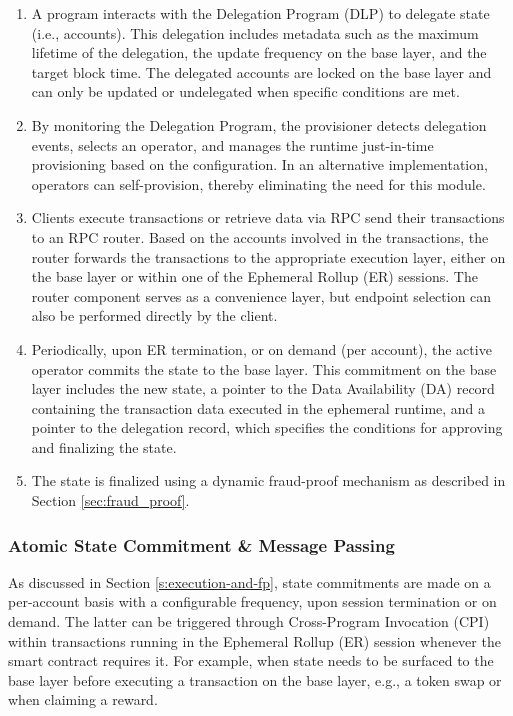 \documentclass{article}
\begin{document}
\begin{enumerate}
    \item A program interacts with the Delegation Program (DLP) to delegate state (i.e., accounts). This delegation includes metadata such as the maximum lifetime of the delegation, the update frequency on the base layer, and the target block time. The delegated accounts are locked on the base layer and can only be updated or undelegated when specific conditions are met.
    
    \item By monitoring the Delegation Program, the provisioner detects delegation events, selects an operator, and manages the runtime just-in-time provisioning based on the configuration. In an alternative implementation, operators can self-provision, thereby eliminating the need for this module.

    \item Clients execute transactions or retrieve data via RPC send their transactions to an RPC router. Based on the accounts involved in the transactions, the router forwards the transactions to the appropriate execution layer, either on the base layer or within one of the Ephemeral Rollup (ER) sessions. The router component serves as a convenience layer, but endpoint selection can also be performed directly by the client.

    \item Periodically, upon ER termination, or on demand (per account), the active operator commits the state to the base layer. This commitment on the base layer includes the new state, a pointer to the Data Availability (DA) record containing the transaction data executed in the ephemeral runtime, and a pointer to the delegation record, which specifies the conditions for approving and finalizing the state.
    
    \item The state is finalized using a dynamic fraud-proof mechanism as described in Section \ref{sec:fraud_proof}.
\end{enumerate}

\subsubsection{Atomic State Commitment \& Message Passing}
\label{ss:atomicity}

As discussed in Section \ref{s:execution-and-fp}, state commitments are made on a per-account basis with a configurable frequency, upon session termination or on demand. The latter can be triggered through Cross-Program Invocation (CPI) within transactions running in the Ephemeral Rollup (ER) session whenever the smart contract requires it. For example, when state needs to be surfaced to the base layer before executing a transaction on the base layer, e.g., a token swap or when claiming a reward.
\end{document}
